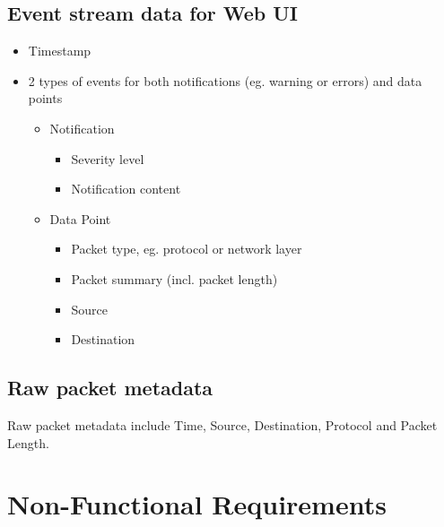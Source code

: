 \documentclass[twoside, english, draft]{Pflichtenheft}
\begin{document}
\subsection{Event stream data for Web UI}

\begin{itemize}
	\item Timestamp
	\item 2 types of events for both notifications (eg. warning or errors) and data points
	      \begin{itemize}
		      \item Notification
		            \begin{itemize}
			            \item Severity level
			            \item Notification content
		            \end{itemize}
		      \item Data Point
		            \begin{itemize}
			            \item Packet type, eg. protocol or network layer
			            \item Packet summary (incl. packet length)
			            \item Source
			            \item Destination
		            \end{itemize}
	      \end{itemize}
\end{itemize}

\subsection{Raw packet metadata}
\begin{description}
	\item
	      Raw packet metadata include Time, Source, Destination, Protocol and Packet Length.
\end{description}

\section{Non-Functional Requirements}
\end{document}
